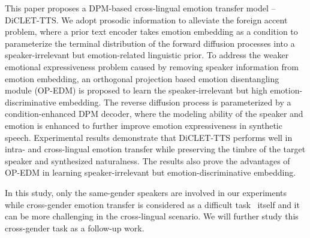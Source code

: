 \documentclass[journal,comsoc]{IEEEtran}
\begin{document}
This paper proposes a DPM-based cross-lingual emotion transfer model -- DiCLET-TTS.
We adopt prosodic information to alleviate the foreign accent problem, where a prior text encoder takes emotion embedding as a condition to parameterize the terminal distribution of the forward diffusion processes into a speaker-irrelevant but emotion-related linguistic prior.
To address the weaker emotional expressiveness problem caused by removing speaker information from emotion embedding, an orthogonal projection based emotion disentangling module (OP-EDM) is proposed to learn the speaker-irrelevant but high emotion-discriminative embedding.
The reverse diffusion process is parameterized by a condition-enhanced DPM decoder, where the modeling ability of the speaker and emotion is enhanced to further improve emotion expressiveness in synthetic speech.
Experimental results demonstrate that DiCLET-TTS performs well in intra- and cross-lingual emotion transfer while preserving the timbre of the target speaker and synthesized naturalness. 
The results also prove the advantages of OP-EDM in learning speaker-irrelevant but emotion-discriminative embedding.

In this study, only the same-gender speakers are involved in our experiments while cross-gender emotion transfer is considered as a difficult task~\cite{shang2021incorporating} itself and it can be more challenging in the cross-lingual scenario. We will further study this cross-gender task as a follow-up work.



%
\end{document}
